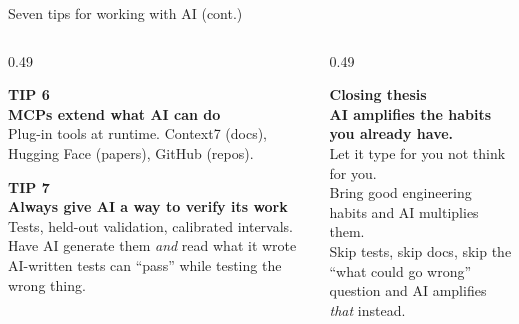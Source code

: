 \documentclass[aspectratio=169,11pt]{beamer}
\newcommand{\tipcard}[3]{%
  \begin{tcolorbox}[
    colback=cardbg, colframe=jrcblue, boxrule=1pt, arc=3pt,
    left=8pt, right=8pt, top=4pt, bottom=4pt,
    fontupper=\small,
  ]
    {\textbf{#1}}\\[1pt]
    {\color{jrcblue}\textbf{#2}}\\[3pt]
    #3
  \end{tcolorbox}%
}
\begin{document}
\begin{frame}{Seven tips for working with AI (cont.)}
  \begin{columns}[t,onlytextwidth]
    \begin{column}{0.49\textwidth}
      \tipcard{TIP 6}{MCPs extend what AI can do}{%
        Plug-in tools at runtime. Context7 (docs), Hugging Face (papers), GitHub (repos).}
      \tipcard{TIP 7}{Always give AI a way to verify its work}{%
        Tests, held-out validation, calibrated intervals. Have AI generate them \emph{and} read what it wrote
        \textemdash{} AI-written tests can ``pass'' while testing the wrong thing.}
    \end{column}
    \begin{column}{0.49\textwidth}
      \begin{tcolorbox}[colback=jrcblue!8, colframe=jrcblue, boxrule=1.5pt, arc=3pt,
                        left=10pt, right=10pt, top=8pt, bottom=8pt, fontupper=\small]
        {\color{jrcblue}\textbf{\large Closing thesis}}\\[6pt]
        \textbf{AI amplifies the habits you already have.}\\[6pt]
        Let it type for you \textemdash{} not think for you.\\[6pt]
        Bring good engineering habits and AI multiplies them.\\[6pt]
        Skip tests, skip docs, skip the ``what could go wrong'' question \textemdash{} and AI amplifies \emph{that} instead.
      \end{tcolorbox}
    \end{column}
  \end{columns}
\end{frame}
\end{document}
